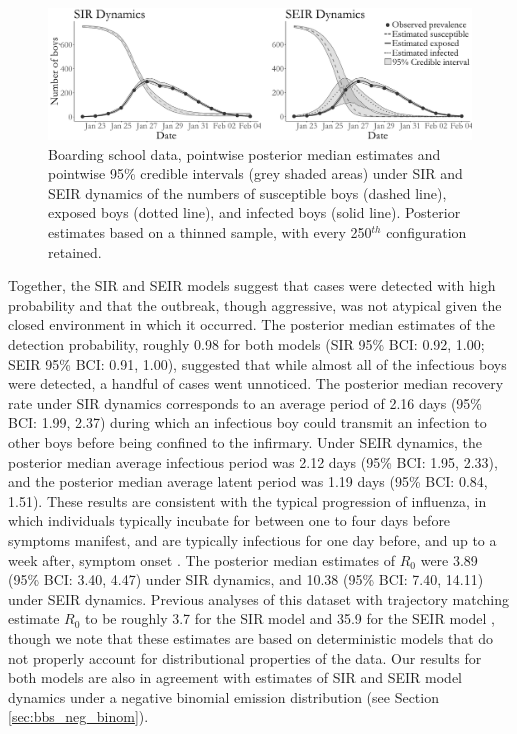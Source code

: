 \begin{figure}[ht!]
	\centering
	\includegraphics[width=\linewidth]{figures/bbs_latent_posts.pdf}
	\caption[Boarding school data and latent posterior under SIR and SEIR dynamics.]{Boarding school data, pointwise posterior median estimates and pointwise 95\% credible intervals (grey shaded areas) under SIR and SEIR dynamics of the numbers of susceptible boys (dashed line), exposed boys (dotted line), and infected boys (solid line). Posterior estimates based on a thinned sample, with every 250$ ^{th} $ configuration retained.}
	\label{fig:bbs_dat}
\end{figure}

Together, the SIR and SEIR models suggest that cases were detected with high probability and that the outbreak, though aggressive, was not atypical given the closed environment in which it occurred. The posterior median estimates of the detection probability, roughly 0.98 for both models (SIR 95\% BCI: 0.92, 1.00; SEIR 95\% BCI: 0.91, 1.00), suggested that while almost all of the infectious boys were detected, a handful of cases went unnoticed. The posterior median recovery rate under SIR dynamics corresponds to an average period of 2.16 days (95\% BCI: 1.99, 2.37) during which an infectious boy could transmit an infection to other boys before being confined to the infirmary. Under SEIR dynamics, the posterior median average infectious period was 2.12 days (95\% BCI: 1.95, 2.33), and the posterior median average latent period was 1.19 days (95\% BCI: 0.84, 1.51). These results are consistent with the typical progression of influenza, in which individuals typically incubate for between one to four days before symptoms manifest, and are typically infectious for one day before, and up to a week after, symptom onset \citep{cdcFlu}. The posterior median estimates of $ R_0 $ were 3.89 (95\% BCI: 3.40, 4.47) under SIR dynamics, and 10.38 (95\% BCI: 7.40, 14.11) under SEIR dynamics. Previous analyses of this dataset with trajectory matching estimate $ R_0 $ to be roughly 3.7 for the SIR model and 35.9 for the SEIR model \citep{wearing2005, keeling2008}, though we note that these estimates are based on deterministic models that do not properly account for distributional properties of the data. Our results for both models are also in agreement with estimates of SIR and SEIR model dynamics under a negative binomial emission distribution (see Section \ref{sec:bbs_neg_binom}).

